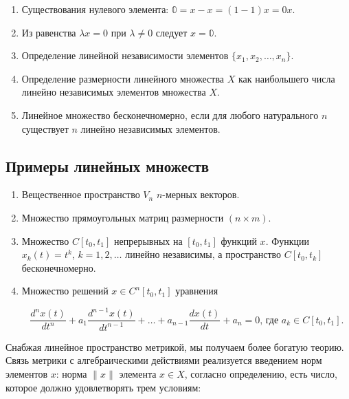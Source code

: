 \documentclass[12pt,a4paper,titlepage,oneside]{book}
\theoremstyle{definition}
\theoremstyle{plain}
\theoremstyle{break}
\theoremstyle{remark}
\theoremstyle{remark}
\theoremstyle{remark}
\theoremstyle{remark}
\theoremstyle{plain}
\theoremstyle{plain}
\begin{document}
\begin{enumerate}

	\item Существования нулевого элемента: $\mathbb{0}=x-x=(1-1)x=0x$.

	\item Из равенства $\lambda x=0$ при $\lambda\ne0$ следует $x=\mathbb{0}$.

	\item Определение линейной независимости элементов $\{x_1,x_2, \ldots, x_n\}$.

	\item Определение размерности линейного множества $X$ как наибольшего числа линейно независимых элементов множества $X$.

	\item Линейное множество бесконечномерно, если для любого натурального $n$ существует $n$ линейно независимых элементов.

\end{enumerate}

\subsection*{Примеры линейных множеств}

\begin{enumerate}

	\item Вещественное пространство $V_n$ $n$-мерных векторов.

	\item Множество прямоугольных матриц размерности $(n\times m)$.

	\item Множество $C[t_0,t_1]$ непрерывных на $[t_0,t_1]$ функций $x$. Функции $x_k(t)=t^k$, $k=1,2,\ldots$ линейно независимы, а пространство $C[t_0,t_k]$ бесконечномерно.

	\item Множество решений $x\in C^n[t_0,t_1]$ уравнения

	\begin{equation*}
	\frac{d^nx(t)}{dt^n}+a_1\frac{d^{n-1}x(t)}{dt^{n-1}}+\ldots+a_{n-1}\frac{dx(t)}{dt}+a_n=0 \mbox{, где } a_k\in C[t_0,t_1].
	\end{equation*}

\end{enumerate}


Снабжая линейное пространство метрикой, мы получаем более богатую теорию. Связь метрики с алгебраическими действиями реализуется введением норм элементов $x$: норма $\lVert x\rVert$ элемента $x\in X$, согласно определению, есть число, которое должно удовлетворять трем условиям:
\end{document}
